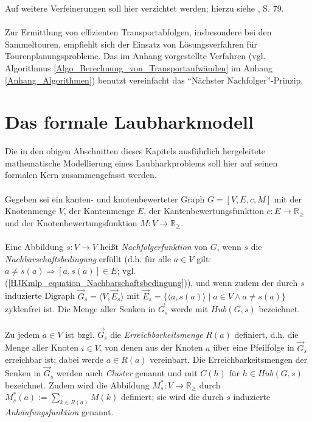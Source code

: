 \documentclass[fontsize=12pt,doubleside,openany,listof=totoc,listof=flat,listof=nochaptergap,numbers=noenddot]{scrbook}
\theoremstyle{style}
\begin{document}
\noindent Auf weitere Verfeinerungen soll hier verzichtet werden; hierzu siehe \cite{kruse}, S. 79.\\
\\
Zur Ermittlung von effizienten Transportabfolgen, insbesondere bei den Sammeltouren, empfiehlt sich der Einsatz von Lösungsverfahren für Tourenplanungsprobleme. Das im Anhang vorgestellte Verfahren (vgl. Algorithmus \ref{Algo_Berechnung_von_Transportaufwänden} im Anhang \ref{Anhang_Algorithmen}) benutzt vereinfacht das "`Nächster Nachfolger"'-Prinzip. 


\section{Das formale Laubharkmodell}
\label{sectionFormalmodell}

\noindent Die in den obigen Abschnitten dieses Kapitels ausführlich hergeleitete mathematische Modellierung eines Laubharkproblems soll hier auf seinen formalen Kern zusammengefasst werden.
\\ \\
Gegeben sei ein kanten- und knotenbewerteter Graph $G= [V,E,c,M]$ mit der Knotenmenge $V$, der Kantenmenge $E$, der Kantenbewertungsfunktion $c:E \rightarrow \mathbb{R}_\geq$ und der Knotenbewertungsfunktion $M:V \rightarrow \mathbb{R}_\geq$. \\
\\
Eine Abbildung $s:V \rightarrow V$ heißt \textit{Nachfolgerfunktion} von $G$, wenn $s$ die \textit{Nachbarschaftsbedingung} erfüllt (d.h. für alle $a \in V$ gilt: $a \neq s(a) \Rightarrow [a,s(a)] \in E$; vgl. (\ref{HJKmlp_equation_Nachbarschaftsbedingung})), und wenn zudem der durch $s$ induzierte Digraph $\vec{G}_s=\langle V, \vec{E}_s \rangle$ mit $\vec{E}_s=\{\langle a,s(a)\rangle \mid a \in V \wedge a \neq s(a)\}$ zyklenfrei ist. Die  Menge aller Senken in $\vec{G}_s$ werde mit $Hub(G,s)$ bezeichnet.\\
\\
Zu jedem $a \in V$ ist bzgl. $\vec{G}_s$ die \textit{Erreichbarkeitsmenge}\label{Erreichbarkeitsmenge_2} $R(a)$ definiert, d.h. die Menge aller Knoten $i \in V$, von denen aus der Knoten $a$ über eine Pfeilfolge in $\vec{G}_s$ erreichbar ist; dabei werde $a \in R(a)$ vereinbart. Die Erreichbarkeitsmengen der Senken in $\vec{G}_s$ werden auch \textit{Cluster}\label{Cluster} genannt und mit $C(h)$ für $h \in Hub(G,s)$ bezeichnet. Zudem wird die Abbildung $M^*_s:V \rightarrow \mathbb{R}_\geq$ durch $M^*_s(a) := \sum\limits_{k \in R(a)}M(k)$ definiert; sie wird die durch $s$ induzierte \textit{Anhäufungsfunktion}\label{Anhäufungsfunktion_2} genannt. \\
\end{document}
